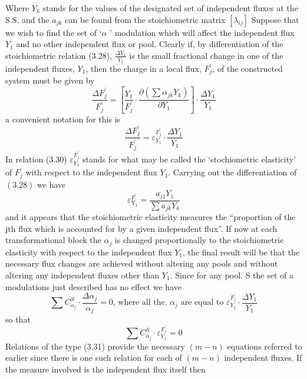 Where $Y_{k}$ stands for the values of the designated set of independent fluxes at the S.S. and the $a_{jk}$ can be found from the stoichiometric matrix $\left[\lambda_{ij}\right]$ Suppose that we wish to find the set of `$\alpha$ ' modulation which will affect the independent flux $Y_{1}$ and no other independent flux or pool. Clearly if, by differentiation of the stoichiometric relation (3.28), $\frac{\Delta Y_{1}}{Y_{1}}$ is the small fractional change in one of the independent fluxes, $Y_{1}$, then the charge in a local flux, $F_{j}^{\prime}$, of the constructed system must be given by
%
\begin{equation}
\frac{\Delta F_{j}^{\prime}}{F_{j}^{\prime}} = \left[\frac{Y_{1}}{F_{j}^{\prime}} \cdot \frac{\partial\left(\sum \alpha_{jk} Y_{k}\right)}{\partial Y_{1}}\right] \cdot \frac{\Delta Y_{1}}{Y_{1}}
\label{eqn:329}
\end{equation}
%
a convenient notation for this is
%
\begin{equation}
\frac{\Delta F_{j}^{\prime}}{F_{j}^{\prime}} = \varepsilon_{Y_{1}}^{F^\prime_j} \cdot \frac{\Delta Y_{1}}{Y_{1}}
\label{eqn:330}
\end{equation}
%
In relation (3.30) $\varepsilon^{F^\prime_j}_{Y_1}$ stands for what may be called the `stochiometric elasticity' of $F_{j}^{\prime}$ with respect to the independent flux $Y_{1}$. Carrying out the differentiation of $(3.28)$ we have
%
$$
\varepsilon_\mathrm{Y_1}^{F^\prime} = \frac{a_{j1} Y_{1}}{\sum a_{jk} {Y}_{k}}
$$
%
and it appears that the stoichiometric elasticity measures the ``proportion of the jth flux which is accounted for by a given independent flux''. If now at each transformational block the $\alpha_{j}$ is changed proportionally to the stoichiometric elasticity with respect to the independent flux $Y_{1}$, the final result will be that the necessary flux changes are achieved without altering any pools and without altering any independent fluxes other than $Y_{1}$. Since for any pool. S the set of a modulations just described has no effect we have
%
$$
\sum C_{\alpha_{j}}^{S} \cdot \frac{\Delta \alpha_{j}}{\alpha_{j}}=0 \text {, where all the. } \alpha_{j} \text { are equal to } \varepsilon_{Y_{1}}^{F_{j}^{\prime}} \cdot \frac{\Delta Y_{1}}{Y_{1}}
$$
%
so that
%
\begin{equation}
\sum C_{\alpha_{j}}^{S} \cdot \varepsilon_{Y_1}^{F_{1}^{\prime}} = 0
\label{eqn:331}
\end{equation}
%
Relations of the type (3.31) provide the necessary $(m-n)$ equations referred to earlier since there is one such relation for each of $(m-n)$ independent fluxes. If the measure involved is the independent flux itself then
